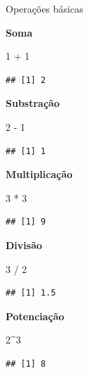 \documentclass[
  10pt,
  ignorenonframetext,
]{beamer}
\newenvironment{Shaded}{}{}
\newcommand{\DecValTok}[1]{#1}
\newcommand{\OperatorTok}[1]{#1}
\newcommand{\StringTok}[1]{\textcolor[rgb]{0.00,0.50,0.50}{#1}}
\begin{document}
\begin{frame}[fragile]{Operações básicas}
\protect\hypertarget{operauxe7uxf5es-buxe1sicas}{}
\footnotesize

\textbf{Soma}

\begin{Shaded}
\begin{Highlighting}[]
\DecValTok{1} \OperatorTok{+}\StringTok{ }\DecValTok{1}
\end{Highlighting}
\end{Shaded}

\begin{verbatim}
## [1] 2
\end{verbatim}

\textbf{Substração}

\begin{Shaded}
\begin{Highlighting}[]
\DecValTok{2} \OperatorTok{{-}}\StringTok{ }\DecValTok{1}
\end{Highlighting}
\end{Shaded}

\begin{verbatim}
## [1] 1
\end{verbatim}

\textbf{Multiplicação}

\begin{Shaded}
\begin{Highlighting}[]
\DecValTok{3} \OperatorTok{*}\StringTok{ }\DecValTok{3}
\end{Highlighting}
\end{Shaded}

\begin{verbatim}
## [1] 9
\end{verbatim}

\textbf{Divisão}

\begin{Shaded}
\begin{Highlighting}[]
\DecValTok{3} \OperatorTok{/}\StringTok{ }\DecValTok{2}
\end{Highlighting}
\end{Shaded}

\begin{verbatim}
## [1] 1.5
\end{verbatim}

\textbf{Potenciação}

\begin{Shaded}
\begin{Highlighting}[]
\DecValTok{2}\OperatorTok{\^{}}\DecValTok{3}
\end{Highlighting}
\end{Shaded}

\begin{verbatim}
## [1] 8
\end{verbatim}

\normalsize
\end{frame}
\end{document}
